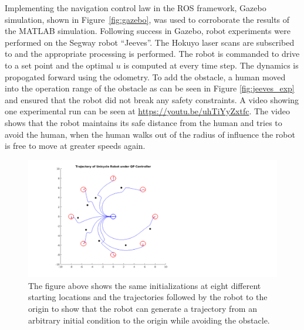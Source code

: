 \documentclass[conference]{IEEEtran}
\begin{document}
Implementing the navigation control law in the ROS framework, Gazebo simulation, shown in Figure~\ref{fig:gazebo}, was used to corroborate the results of the MATLAB simulation. Following success in Gazebo, robot experiments were performed on the Segway robot ``Jeeves''. The Hokuyo laser scans are subscribed to and the appropriate processing is performed. The robot is commanded to drive to a set point and the optimal $u$ is computed at every time step. The dynamics is propogated forward using the odometry. To add the obstacle, a human moved into the operation range of the obstacle as can be seen in Figure \ref{fig:jeeves_exp} and ensured that the robot did not break any safety constraints. A video showing one experimental run can be seen at \url {https://youtu.be/uhTiYyZxtfc}. The video shows that the robot maintains its safe distance from the human and tries to avoid the human, when the human walks out of the radius of influence the robot is free to move at greater speeds again.

\begin{figure}[h!]
\centering
\includegraphics[scale=0.3]{octoPlotProofEditSqur.png} 
\caption{The figure above shows the same initializations at eight different starting locations and the trajectories followed by the robot to the origin to show that the robot can generate a trajectory from an arbitrary initial condition to the origin while avoiding the obstacle.\label{fig:octoplot}} 
\end{figure}
\end{document}
